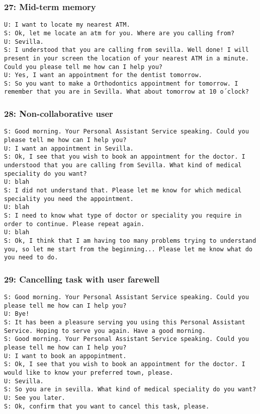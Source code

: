\documentclass[11pt]{beamer}
\newcommand{\system}[1]{{\color{red}\texttt{S: #1}}\\}
\newcommand{\user}[1]{{\color{teal}\texttt{U: #1}}\\}
\begin{document}
\begin{frame}
\frametitle{27: Mid-term memory}
\user{I want to locate my nearest ATM.}
\system{Ok, let me locate an atm for you. Where are you calling from?}
\user{Sevilla.}
\system{I understood that you are calling from sevilla. Well done! I will present in your screen the location of your nearest ATM in a minute. Could you please tell me how can I help you?}
\user{Yes, I want an appointment for the dentist tomorrow.}
\system{So you want to make a Orthodontics appointment for tomorrow. I remember that you are in Sevilla. What about tomorrow at 10 o´clock?}
\end{frame}

\begin{frame}
\frametitle{28: Non-collaborative user}
\footnotesize
\system{Good morning. Your Personal Assistant Service speaking. Could you please tell me how can I help you?}
\user{I want an appointment in Sevilla.}
\system{Ok, I see that you wish to book an appointment for the doctor. I understood that you are calling from Sevilla. What kind of medical speciality do you want?}
\user{blah}
\system{I did not understand that. Please let me know for which medical speciality you need the appointment.}
\user{blah}
\system{I need to know what type of doctor or speciality you require in order to continue. Please repeat again.}
\user{blah}
\system{Ok, I think that I am having too many problems trying to understand you, so let me start from the beginning... Please let me know what do you need to do.}
\end{frame}

\begin{frame}
\footnotesize
\frametitle{29: Cancelling task with user farewell}
\system{Good morning. Your Personal Assistant Service speaking. Could you please tell me how can I help you?}
\user{Bye!}
\system{It has been a pleasure serving you using this Personal Assistant Service. Hoping to serve you again. Have a good morning.}
\vspace{10pt}
\system{Good morning. Your Personal Assistant Service speaking. Could you please tell me how can I help you?}
\user{I want to book an appopintment.}
\system{Ok, I see that you wish to book an appointment for the doctor. I would like to know your preferred town, please.}
\user{Sevilla.}
\system{So you are in sevilla. What kind of medical speciality do you want?}
\user{See you later.}
\system{Ok, confirm that you want to cancel this task, please.}
\end{frame}
\end{document}

